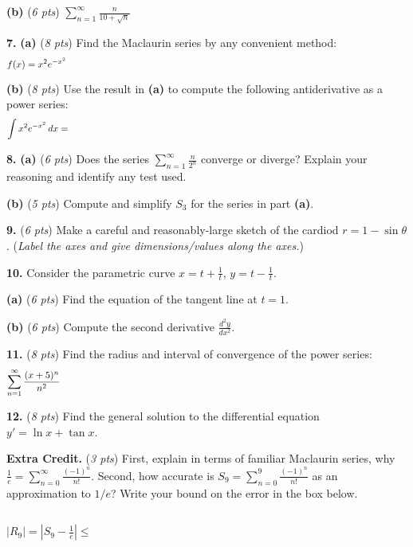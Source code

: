 \documentclass[11pt]{amsart}
\newcommand{\ds}{\displaystyle}
\newcommand{\prob}[1]{\bigskip\noindent\textbf{#1.} }
\newcommand{\pts}[1]{(\emph{#1 pts})}
\newcommand{\probpts}[2]{\prob{#1} \pts{#2} \quad}
\newcommand{\ppartpts}[2]{\textbf{(#1)} \pts{#2} \quad}
\newcommand{\epartpts}[2]{\medskip\noindent \textbf{(#1)} \pts{#2} \quad}
\begin{document}
\epartpts{b}{6}  $\ds \sum_{n = 1}^\infty \frac{n}{10 + \sqrt{n}}$
\vfill


\clearpage\newpage
\prob{7}  \ppartpts{a}{8}  Find the Maclaurin series by any convenient method:
\large
    $$f(x) = x^2 e^{-x^2} \hspace{5.0in}$$
\normalsize
\vfill

\epartpts{b}{8}  Use the result in \textbf{(a)} to compute the following antiderivative as a power series:
\large
    $$\int x^2 e^{-x^2}\,dx = \hspace{5.0in}$$
\normalsize
\vfill


\clearpage\newpage
\prob{8}  \ppartpts{a}{6}  Does the series $\ds \sum_{n=1}^\infty \frac{n}{2^n}$ converge or diverge?  Explain your reasoning and identify any test used.
\vspace{2.5in}

\epartpts{b}{5}  Compute and simplify $S_3$ for the series in part \textbf{(a)}.
\vspace{1.5in}

\probpts{9}{6}  Make a careful and reasonably-large sketch of the cardiod $r = 1 - \sin\theta$.  (\emph{Label the axes and give dimensions/values along the axes.})
\vfill


\clearpage\newpage
\prob{10}  Consider the parametric curve $\ds x = t + \frac{1}{t}$, $\ds y = t - \frac{1}{t}$.

\epartpts{a}{6}  Find the equation of the tangent line at $t=1$.
\vfill

\epartpts{b}{6}  Compute the second derivative $\ds \frac{d^2 y}{dx^2}$.
\vfill


\clearpage\newpage
\probpts{11}{8}  Find the radius and interval of convergence of the power series:
    $$\sum_{n = 1}^\infty \frac{(x + 5)^n}{n^2} \hspace{5.0in}$$
\vfill

\probpts{12}{8}  Find the general solution to the differential equation $y' = \ln x + \tan x$.
\vfill


\clearpage\newpage
\probpts{Extra Credit}{3}  First, explain in terms of familiar Maclaurin series, why $\ds \frac{1}{e} = \sum_{n=0}^\infty \frac{(-1)^n}{n!}$.  Second, how accurate is $\ds S_{9} = \sum_{n=0}^{9} \frac{(-1)^n}{n!}$ as an approximation to $1/e$?  Write your bound on the error in the box below.

\vfill
\hspace{-4mm} $\ds |R_{9}| = \left|S_{9} - \frac{1}{e}\right| \le \boxed{\phantom{\begin{matrix} lakjsd alsfjd \\ sdfa \\ sdaf \end{matrix}}}$
\bigskip
\end{document}
